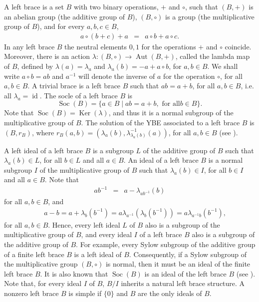 \documentclass[10pt]{article}
\renewcommand{\ker}{\operatorname{Ker}}
\newcommand{\id}{\operatorname{id}}
\newcommand{\aut}{\operatorname{Aut}}
\newcommand{\soc}{\operatorname{Soc}}
\begin{document}
A left brace is a set $B$ with two binary operations, $+$ and
$\circ$, such that $(B,+)$ is an abelian group (the additive group
of $B$), $(B,\circ)$ is a group (the multiplicative group of $B$),
and for every $a,b,c\in B$,
 \begin{eqnarray} \label{braceeq}
  a\circ (b+c)+a&=&a\circ b+a\circ c.
 \end{eqnarray}
In any left brace $B$  the neutral elements $0,1$ for the
operations $+$ and $\circ$ coincide. Moreover, there is an action
$\lambda\colon (B,\circ)\longrightarrow \aut(B,+)$, called the
lambda map of $B$, defined by $\lambda(a)=\lambda_a$ and
$\lambda_{a}(b)=-a+a\circ b$, for $a,b\in B$. We shall write
$a\circ b=ab$ and $a^{-1}$ will denote the inverse of $a$ for the
operation $\circ$, for all $a,b\in B$. A trivial brace is a left
brace $B$ such that $ab=a+b$, for all $a,b\in B$, i.e. all
$\lambda_a=\id$. The socle of a left brace $B$ is
$$\soc(B)=\{ a\in B\mid ab=a+b, \mbox{ for all
}b\in B \}.$$ Note that $\soc(B)=\ker(\lambda)$, and thus it is a
normal subgroup of the multiplicative group of $B$. The solution of
the YBE associated to a left brace $B$ is $(B,r_B)$, where
$r_B(a,b)=(\lambda_a(b),\lambda_{\lambda_a(b)}^{-1}(a))$, for all
$a,b\in B$ (see \cite[Lemma~2]{CJOComm}).

A left ideal of a left brace $B$ is a subgroup $L$ of the additive
group of $B$ such that $\lambda_a(b)\in L$, for all $b\in L$ and
all $a\in B$. An ideal of a left brace $B$ is a normal subgroup
$I$ of the multiplicative group of $B$ such that $\lambda_a(b)\in
I$, for all $b\in I$ and all $a\in B$. Note that
\begin{eqnarray}\label{addmult1}
ab^{-1}&=&a-\lambda_{ab^{-1}}(b)
\end{eqnarray}
 for all $a,b\in B$, and
    \begin{eqnarray} \label{addmult2}
     &&a-b=a+\lambda_{b}(b^{-1})= a\lambda_{a^{-1}}(\lambda_b(b^{-1}))= a\lambda_{a^{-1}b}(b^{-1}),
     \end{eqnarray}
for all $a,b\in B$. Hence, every left ideal $L$ of $B$ also is a
subgroup of the multiplicative group of $B$, and every  ideal $I$
of a left brace $B$ also is a subgroup of the additive group of
$B$. For example,  every Sylow subgroup of the additive group of a
finite left brace $B$ is a left ideal of $B$. Consequently, if a
Sylow subgroup of the multiplicative group $(B,\circ)$ is normal,
then it must be an ideal of the finite left brace $B$. It is also
known that $\soc(B)$ is an ideal of the left brace $B$ (see
\cite[Proposition~7]{R07}). Note that, for every ideal $I$ of $B$,
$B/I$ inherits a natural left brace structure. A nonzero left
brace $B$ is simple if $\{0\}$ and $B$ are the only ideals of $B$.
\end{document}

